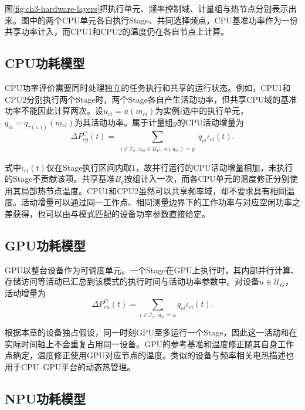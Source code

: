 图\ref{fig:ch3-hardware-layers}把执行单元、频率控制域、计量组与热节点分别表示出来。图中的两个CPU单元各自执行Stage、共同选择频点，CPU基准功率作为一份共享功率计入，而CPU1和CPU2的温度仍在各自节点上计算。



\subsection{CPU功耗模型}

CPU功率评价需要同时处理独立的任务执行和共享的运行状态。例如，CPU1和CPU2分别执行两个Stage时，两个Stage各自产生活动功率，但共享CPU域的基准功率不能因此计算两次。设$u_{ci}=u(m_{ci})$为实例$i$选中的执行单元，$q_{ci}=q_{\tau(c,i)}(m_{ci})$为其活动功率。属于计量组$g$的CPU活动增量为
\begin{equation}
\Delta P^{C}_{cg}(t)=
\sum_{\substack{i\in\mathcal I_c:\,u_{ci}\in\mathcal U_C,\ \pi(u_{ci})=g}}
q_{ci}\iota_{ci}(t).
\label{eq:cpu-active-power}
\end{equation}

式中$\iota_{ci}(t)$仅在Stage执行区间内取1，故并行运行的CPU活动增量相加，未执行的Stage不贡献该项。共享基准$B_g$按组计入一次，而各CPU单元的温度修正分别使用其局部热节点温度。CPU1和CPU2虽然可以共享频率域，却不要求具有相同温度。活动增量可以通过同一工作点、相同测量边界下的工作功率与对应空闲功率之差获得，也可以由与模式匹配的设备功率参数直接给定。

\subsection{GPU功耗模型}

GPU以整台设备作为可调度单元。一个Stage在GPU上执行时，其内部并行计算、存储访问等活动已汇总到该模式的执行时间与活动功率参数中。对设备$u\in\mathcal U_G$，活动增量为
\begin{equation}
\Delta P^{G}_{cu}(t)=
\sum_{i\in\mathcal I_c:\,u_{ci}=u}q_{ci}\iota_{ci}(t).
\label{eq:gpu-active-power}
\end{equation}

根据本章的设备独占假设，同一时刻GPU至多运行一个Stage，因此这一活动和在实际时间轴上不会重复占用同一设备。GPU的参考基准和温度修正随其自身工作点确定，温度修正使用GPU对应节点的温度。类似的设备与频率相关电热描述也用于CPU--GPU平台的动态热管理\cite{fdtm2022}。

\subsection{NPU功耗模型}

